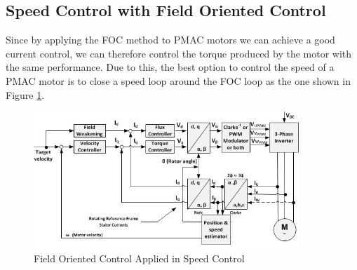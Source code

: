 \subsection{Speed Control with Field Oriented Control}

Since by applying the \ac{FOC} method to \ac{PMAC} motors we can achieve a good current control, we can therefore control the torque produced by the motor with the same performance. Due to this, the best option to control the speed of a \ac{PMAC} motor is to close a speed loop around the \ac{FOC} loop as the one shown in Figure \ref{fig:foc_speed}.

\begin{figure}[htbp]
\centering
\includegraphics[width=10cm]{Images/foc_speed.png} 
\caption[Field Oriented Control applied in Speed Control]{Field Oriented Control Applied in Speed Control}
\label{fig:foc_speed}
\end{figure}